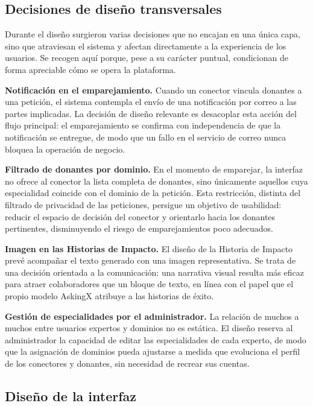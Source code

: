 \documentclass[11pt,oneside,spanish,listoffigures,listoftables]{tfgetsinf}
\begin{document}
\subsection{Decisiones de diseño transversales}

Durante el diseño surgieron varias decisiones que no encajan en una única capa, sino que atraviesan el sistema y afectan directamente a la experiencia de los usuarios. Se recogen aquí porque, pese a su carácter puntual, condicionan de forma apreciable cómo se opera la plataforma.

\textbf{Notificación en el emparejamiento.} Cuando un conector vincula donantes a una petición, el sistema contempla el envío de una notificación por correo a las partes implicadas. La decisión de diseño relevante es desacoplar esta acción del flujo principal: el emparejamiento se confirma con independencia de que la notificación se entregue, de modo que un fallo en el servicio de correo nunca bloquea la operación de negocio.

\textbf{Filtrado de donantes por dominio.} En el momento de emparejar, la interfaz no ofrece al conector la lista completa de donantes, sino únicamente aquellos cuya especialidad coincide con el dominio de la petición. Esta restricción, distinta del filtrado de privacidad de las peticiones, persigue un objetivo de usabilidad: reducir el espacio de decisión del conector y orientarlo hacia los donantes pertinentes, disminuyendo el riesgo de emparejamientos poco adecuados.

\textbf{Imagen en las Historias de Impacto.} El diseño de la Historia de Impacto prevé acompañar el texto generado con una imagen representativa. Se trata de una decisión orientada a la comunicación: una narrativa visual resulta más eficaz para atraer colaboradores que un bloque de texto, en línea con el papel que el propio modelo AskingX atribuye a las historias de éxito.

\textbf{Gestión de especialidades por el administrador.} La relación de muchos a muchos entre usuarios expertos y dominios no es estática. El diseño reserva al administrador la capacidad de editar las especialidades de cada experto, de modo que la asignación de dominios pueda ajustarse a medida que evoluciona el perfil de los conectores y donantes, sin necesidad de recrear sus cuentas.

\subsection{Diseño de la interfaz}
\end{document}
